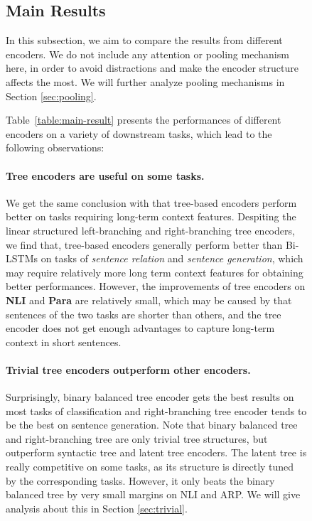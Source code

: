 \documentclass[11pt,a4paper]{article}
\begin{document}
\begin{figure}[t!]
\subsection{Main Results}
\label{sec:main-results}
In this subsection, we aim to compare the results from different encoders. We do not include any attention \cite{wang2016attention,lin2017astructured} or pooling \cite{collobert2008unified,socher2011dynamic,zhou2016text} mechanism here, in order to avoid distractions and make the encoder structure affects the most. 
We will further analyze pooling mechanisms in Section \ref{sec:pooling}.

Table~\ref{table:main-result} presents the performances of different encoders on a variety of downstream tasks, which lead to the following observations:
\paragraph{Tree encoders are useful on some tasks.} We get the same conclusion with  that tree-based encoders perform better on tasks requiring long-term context features.
Despiting the linear structured left-branching and right-branching tree encoders, we find that, tree-based encoders generally perform better than Bi-LSTMs on tasks of \textit{sentence relation} and \textit{sentence generation}, which may require relatively more long term context features for obtaining better performances.
However, the improvements of tree encoders on \textbf{NLI} and \textbf{Para} are relatively small, which may be caused by that sentences of the two tasks are shorter than others, and the tree encoder does not get enough advantages to capture long-term context in short sentences.


\paragraph{Trivial tree encoders outperform other encoders.}
Surprisingly, binary balanced tree encoder gets the best results on most tasks of classification and right-branching tree encoder tends to be the best on sentence generation.
Note that binary balanced tree and right-branching tree are only trivial tree structures, but outperform syntactic tree and latent tree encoders.
The latent tree is really competitive on some tasks, as its  structure is directly tuned by the corresponding tasks.
However, it only beats the binary balanced tree by very small margins on NLI and ARP.
We will give analysis about this in Section \ref{sec:trivial}.



\end{figure}
\end{document}
